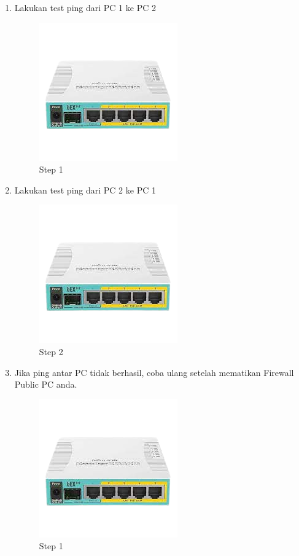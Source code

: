 \begin{enumerate}
	\item Lakukan test ping dari PC 1 ke PC 2
	\begin{figure}[H]
		\centering
		\includegraphics[width=0.5\linewidth]{P1/img/contoh.png}
		\caption{Step 1}
		\label{fig:gambar28}
	\end{figure}

	\item Lakukan test ping dari PC 2 ke PC 1
	\begin{figure}[H]
		\centering
		\includegraphics[width=0.5\linewidth]{P1/img/contoh.png}
		\caption{Step 2}
		\label{fig:gambar29}
	\end{figure}

	\item Jika ping antar PC tidak berhasil, coba ulang setelah mematikan Firewall Public PC anda.
	\begin{figure}[H]
		\centering
		\includegraphics[width=0.5\linewidth]{P1/img/contoh.png}
		\caption{Step 1}
		\label{fig:gambar30}
	\end{figure}


\end{enumerate}


